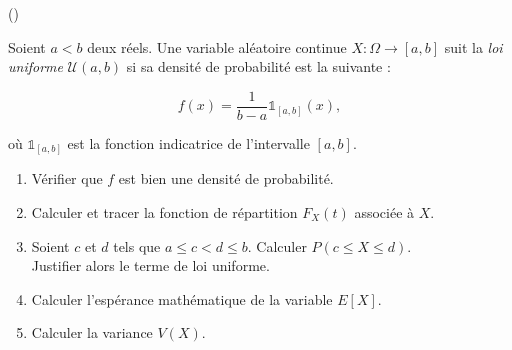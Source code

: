 \begin{exercice}\label{exo4-11} (\minsyndical)

Soient $a<b$ deux r\'eels.
Une variable al\'eatoire continue $X : \Omega \rightarrow [a,b]$ suit la {\it loi uniforme} $\mathcal{U}(a,b)$ si sa densit\'e de probabilit\'e est la suivante :

\[
f(x) = \frac1{b-a} \mathds{1}_{[a,b]} (x),
\]

o\`u $\mathds{1}_{[a,b]}$ est la fonction indicatrice de l'intervalle $[a,b]$.

\begin{enumerate}

\item V\'erifier que $f$ est bien une densit\'e de probabilit\'e.

\item Calculer et tracer la fonction de r\'epartition $F_X(t)$ associ\'ee \`a $X$. 

\item Soient $c$ et $d$ tels que $a\leq c < d \leq b$. Calculer $P(c\leq X \leq d)$.\\
Justifier alors le terme de loi uniforme.

\item Calculer l'esp\'erance math\'ematique de la variable $E[X]$.

\item Calculer la variance $V(X)$.

\end{enumerate}


\end{exercice}
